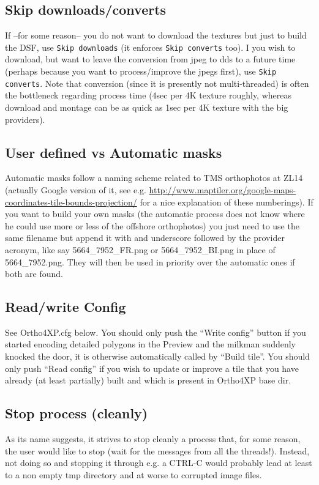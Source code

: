 \documentclass[12pt]{article}
\begin{document}
\subsection{Skip downloads/converts}
If --for some reason-- you do not want to download the textures but just to build the DSF, use {\tt Skip downloads} (it enforces {\tt Skip converts} too). I you wish to download, but want to leave the conversion from jpeg to dds to a future time (perhaps because you want to process/improve the jpegs first), use {\tt Skip converts}. Note that conversion (since it is presently not multi-threaded) is often the bottleneck regarding process time (4sec per 4K texture roughly, whereas download and montage can be as quick as 1sec per 4K texture with the big providers).

\subsection{User defined vs Automatic masks}
Automatic masks follow a naming scheme related to TMS orthophotos at ZL14 (actually Google version of it, see e.g. \href{http://www.maptiler.org/google-maps-coordinates-tile-bounds-projection/}{http://www.maptiler.org/google-maps-coordinates-tile-bounds-projection/} for a nice explanation of these numberings).
If you want to build your own masks (the automatic process does not know where he could use more or less of the offshore orthophotos) you just  need to use the same filename but append it with and underscore followed by the provider acronym, like say 5664\_7952\_FR.png or 5664\_7952\_BI.png in place of 5664\_7952.png. They will then be used in priority over the automatic ones if both are found.

\subsection{Read/write Config}
See Ortho4XP.cfg below. You should only push the ``Write config'' button if you started
encoding detailed polygons in the Preview and the milkman suddenly knocked the door, it is otherwise automatically called by ``Build tile''. You should only push ``Read config''
if you wish to update or improve a tile that you have already (at least partially) built and which is present in Ortho4XP base dir.


\subsection{Stop process (cleanly)}
As its name suggests, it strives to stop cleanly a process that, for some reason, the user would like to stop (wait for the messages from all the threads!). Instead, not doing so and stopping it through e.g. a CTRL-C would probably lead at least to a non empty tmp directory and at worse to corrupted image files.
\end{document}
